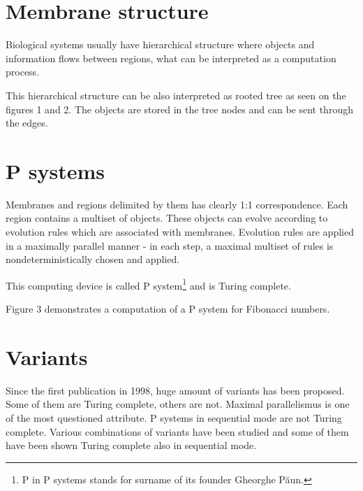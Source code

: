 \documentclass[myposter,portrait]{sciposter}
\def\mysection#1{
{\color{sectionCol}\section*{\sc\bfseries #1}}}
\begin{document}
\begin{multicols*}{3}
\vspace{10mm}

\mysection{Membrane structure}
Biological systems usually have hierarchical structure where objects and information flows between regions, what can be interpreted as a computation process.

This hierarchical structure can be also interpreted as rooted tree as seen on the figures 1 and 2. The objects are stored in the tree nodes and can be sent through the edges.

\mysection{P systems}

Membranes and regions delimited by them has clearly 1:1 correspondence. Each region contains a multiset of objects. These objects can evolve according to evolution rules which are associated with membranes. Evolution rules are applied in a maximally parallel manner - in each step, a maximal multiset of rules is nondeterministically chosen and applied.

This computing device is called P system\footnote{P in P systems stands for surname of its founder Gheorghe P\u aun.} and is Turing complete.

Figure 3 demonstrates a computation of a P system for Fibonacci numbers.

\mysection{Variants}

Since the first publication in 1998, huge amount of variants has been proposed. Some of them are Turing complete, others are not. Maximal parallelismus is one of the most questioned attribute. P systems in sequential mode are not Turing complete. Various combinations of variants have been studied and some of them have been shown Turing complete also in sequential mode.

\end{multicols*}
\end{document}
